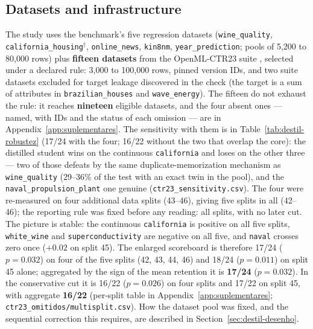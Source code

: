 \subsection{Datasets and infrastructure}
\label{sec:destil-setup}

\begin{sloppypar}
The study uses the benchmark's five regression datasets
(\texttt{wine\_quality},
\texttt{california\_\allowbreak housing}$^\dagger$,
\texttt{online\_news}, \texttt{kin8nm},
\texttt{year\_\allowbreak prediction}; pools of 5{,}200 to 80{,}000
rows) plus \textbf{fifteen datasets} from the OpenML-CTR23 suite
\citep{fischer2023}, selected under a declared rule: 3{,}000 to
100{,}000 rows, pinned version IDs, and two suite datasets excluded
for target leakage discovered in the check (the target is a sum of
attributes in \texttt{brazilian\_\allowbreak houses} and
\texttt{wave\_energy}). The fifteen do not exhaust the rule: it
reaches \textbf{nineteen} eligible datasets, and the four absent
ones --- named, with IDs and the status of each omission --- are in
Appendix~\ref{app:suplementares}. The sensitivity with them is in
Table~\ref{tab:destil-robustez} (17/24 with the four; 16/22 without
the two that overlap the core): the distilled student wins on the
continuous \texttt{california} and loses on the other three --- two
of those defeats by the same duplicate-memorization mechanism as
\texttt{wine\_quality} (29--36\% of the test with an exact twin in
the pool), and the
\texttt{naval\_\allowbreak propulsion\_\allowbreak plant} one genuine
(\texttt{ctr23\_\allowbreak sensitivity.csv}). The four were re-measured on
four additional data splits (43--46), giving five splits in all
(42--46); the reporting rule was fixed before any reading: all
splits, with no later cut. The picture is stable: the continuous
\texttt{california} is positive on all five splits,
\texttt{white\_wine} and \texttt{superconductivity} are negative on
all five, and \texttt{naval} crosses zero once ($+0.02$ on split
45). The enlarged scoreboard is therefore 17/24 ($p=0.032$) on four
of the five splits (42, 43, 44, 46) and 18/24 ($p=0.011$) on split
45 alone; aggregated by the sign of the mean retention it is
\textbf{17/24} ($p=0.032$). In the conservative cut it is 16/22
($p=0.026$) on four splits and 17/22 on split 45, with aggregate
\textbf{16/22} (per-split table in
Appendix~\ref{app:suplementares};
\texttt{ctr23\_\allowbreak omitidos/\allowbreak multisplit.csv}).
How the dataset pool was fixed, and the sequential correction this
requires, are described in Section~\ref{sec:destil-desenho}.


\end{sloppypar}
